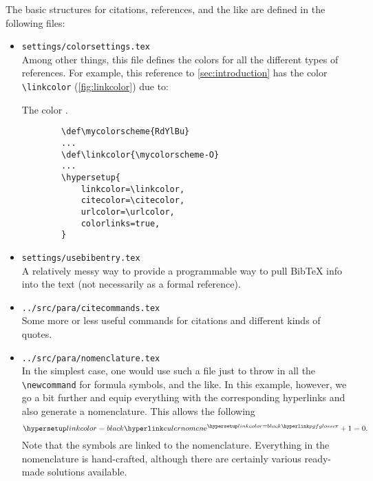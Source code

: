 The basic structures for citations, references, and the like are defined in the following files:
\begin{itemize}
	\item \texttt{settings/colorsettings.tex} \\ 
	Among other things, this file defines the colors for all the different types of references. For example, this reference to \cref{sec:introduction} has the color \linebreak \verb|\linkcolor| (\cf \cref{fig:linkcolor}) due to:
	\begin{marginfigure}[0cm]
		\centering
		\caption{The color \texttt{\linkcolor}.}\label{fig:linkcolor}
	\end{marginfigure}
	\begin{verbatim}
		\def\mycolorscheme{RdYlBu}
		...
		\def\linkcolor{\mycolorscheme-O}
		...
		\hypersetup{
			linkcolor=\linkcolor,
			citecolor=\citecolor,
			urlcolor=\urlcolor,
			colorlinks=true,
		}
	\end{verbatim}
	\item \texttt{settings/usebibentry.tex} \\ 
	A relatively messy way to provide a programmable way to pull BibTeX info into the text (not necessarily as a formal reference).
	
	\item \texttt{../src/para/citecommands.tex} \\ 
	Some more or less useful commands for citations and different kinds of quotes.
	
	\item \texttt{../src/para/nomenclature.tex} \\ 
	In the simplest case, one would use such a file just to throw in all the \verb|\newcommand| for formula symbols, and the like. In this example, however, we go a bit further and equip everything with the corresponding hyperlinks and also generate a nomenclature. This allows the following
	\begin{equation}\label{eq:mostbeautifulequation}
		\euler^{\complexunit\pi} + 1 = 0.
	\end{equation}
	Note that the symbols are linked to the nomenclature. Everything in the nomenclature is hand-crafted, although there are certainly various ready-made solutions available.
	

\end{itemize}
